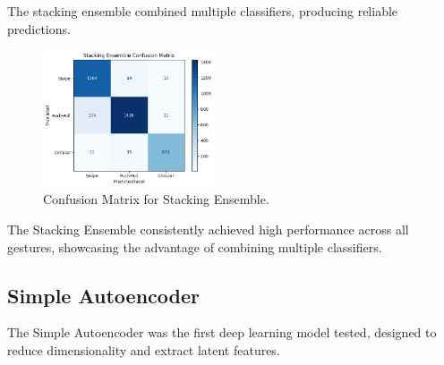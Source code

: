 \documentclass[10pt,twocolumn,letterpaper]{article}
\begin{document}
The stacking ensemble combined multiple classifiers, producing reliable predictions.

\begin{table}[h]
\small
\begin{center}
\caption{Performance Metrics for Stacking Ensemble}
\vspace{0.1cm}
\end{center}
\end{table}

\begin{figure}[h]
  \centering
  \includegraphics[width=0.45\textwidth]{figures/confusion_matrix_stacking.png}
  \caption{Confusion Matrix for Stacking Ensemble.}
  \label{fig:confusion_matrix_stacking}
\end{figure}

The Stacking Ensemble consistently achieved high performance across all gestures, showcasing the advantage of combining multiple classifiers.

\subsection{Simple Autoencoder}

The Simple Autoencoder was the first deep learning model tested, designed to reduce dimensionality and extract latent features.
\end{document}
